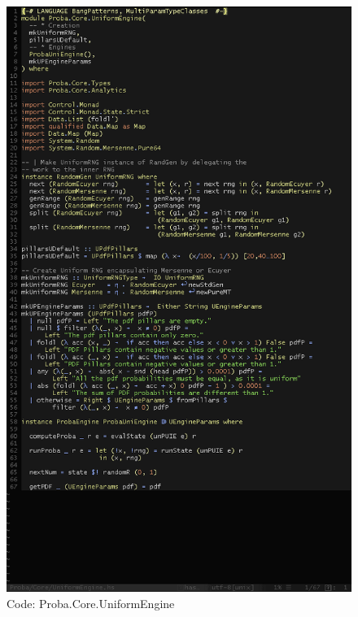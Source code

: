\documentclass[12pt,a4paper,titlepage]{article}
\begin{document}
\begin{figure}[h!]
\centering
\includegraphics[width=1\textwidth]{img/code-ue.png}
\caption{Code: Proba.Core.UniformEngine}
\label{fig:core.u}
\end{figure}
\end{document}
